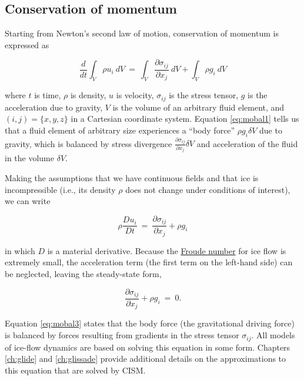 \subsection{Conservation of momentum}

Starting from Newton's second law of motion, conservation of momentum is expressed as

\begin{equation}
\frac{d} {dt} \int_{V}\rho u_{i}~dV ~ = ~ \int_{V} \frac{\partial \sigma_{ij}} {\partial x_{j}} ~dV +  \int_{V} \rho g_{i}~dV
\label{eq:mobal1}
\end{equation}

\noindent
where $t$ is time, $\rho$ is density, $u$ is
velocity, $\sigma_{ij}$ is the stress tensor, $g$ is the
acceleration due to gravity, $V$ is the volume of an arbitrary
fluid element, and $(i,j)= \{x, y, z\}$ in a Cartesian coordinate
system. Equation \eqref{eq:mobal1} tells us that a fluid element of arbitrary size 
experiences a ``body force'' $\rho g_{i}\delta V$ due to gravity, which is balanced by 
stress divergence $\frac{\partial \sigma_{ij}} {\partial x_{j}} \delta V$ and acceleration
of the fluid in the volume $\delta V$. 

Making the assumptions that we have continuous fields and that ice is incompressible (i.e., 
its density $\rho$ does not change under conditions of interest), we can write

\begin{equation}
\rho \frac{D u_{i}}{D t}~=~\frac{\partial \sigma_{ij}}{\partial x_{j}} + \rho g_{i}
\label{eq:mobal2}
\end{equation}

\noindent
in which $D$ is a material derivative. Because the \href{http://en.wikipedia.org/wiki/Froude_number}
{Froude number} for ice flow is extremely small, the acceleration term (the first term on the left-hand side) can be 
neglected, leaving the steady-state form, 

\begin{equation}
\frac{\partial \sigma_{ij}}{\partial x_{j}} + \rho g_{i} ~=~0.
\label{eq:mobal3}
\end{equation}

Equation \eqref{eq:mobal3} states that the body force (the gravitational driving force) is balanced by forces resulting from 
gradients in the stress tensor $\sigma_{ij}$. All models of ice-flow dynamics are based on solving this equation in some form.
Chapters \ref{ch:glide} and \ref{ch:glissade} provide additional details on the approximations to this equation that are
solved by CISM.

